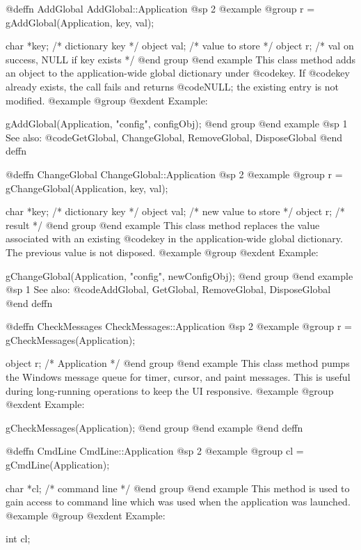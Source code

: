 @deffn {AddGlobal} AddGlobal::Application
@sp 2
@example
@group
r = gAddGlobal(Application, key, val);

char    *key;   /*  dictionary key     */
object  val;    /*  value to store     */
object  r;      /*  val on success, NULL if key exists  */
@end group
@end example
This class method adds an object to the application-wide global
dictionary under @code{key}.  If @code{key} already exists, the call
fails and returns @code{NULL}; the existing entry is not modified.
@example
@group
@exdent Example:

gAddGlobal(Application, "config", configObj);
@end group
@end example
@sp 1
See also:  @code{GetGlobal, ChangeGlobal, RemoveGlobal, DisposeGlobal}
@end deffn



@deffn {ChangeGlobal} ChangeGlobal::Application
@sp 2
@example
@group
r = gChangeGlobal(Application, key, val);

char    *key;   /*  dictionary key       */
object  val;    /*  new value to store   */
object  r;      /*  result               */
@end group
@end example
This class method replaces the value associated with an existing
@code{key} in the application-wide global dictionary.  The previous
value is not disposed.
@example
@group
@exdent Example:

gChangeGlobal(Application, "config", newConfigObj);
@end group
@end example
@sp 1
See also:  @code{AddGlobal, GetGlobal, RemoveGlobal, DisposeGlobal}
@end deffn



@deffn {CheckMessages} CheckMessages::Application
@sp 2
@example
@group
r = gCheckMessages(Application);

object  r;      /*  Application  */
@end group
@end example
This class method pumps the Windows message queue for timer, cursor,
and paint messages.  This is useful during long-running operations to
keep the UI responsive.
@example
@group
@exdent Example:

gCheckMessages(Application);
@end group
@end example
@end deffn



@deffn {CmdLine} CmdLine::Application
@sp 2
@example
@group
cl = gCmdLine(Application);

char    *cl;    /*  command line   */
@end group
@end example
This method is used to gain access to command line which was used when
the application was launched.
@example
@group
@exdent Example:

int     cl;

